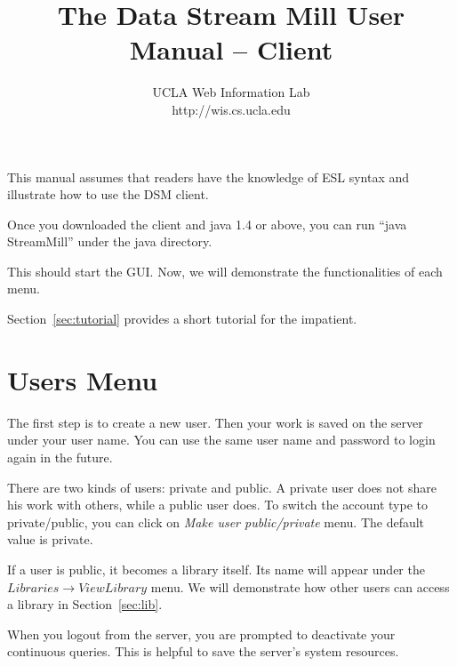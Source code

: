 \documentclass[10pt]{article}
\title{\Huge \bf The Data Stream Mill User Manual -- Client \\}
\author{\Large UCLA Web Information Lab\\http://wis.cs.ucla.edu}
\begin{document}
\maketitle

This manual assumes that readers have the knowledge of ESL syntax \cite{ESL} and illustrate how to use the DSM client.

Once you downloaded the client and java 1.4 or above, you can run ``java StreamMill'' under the java directory.

This should start the GUI. Now, we will demonstrate the functionalities of each menu.

Section~\ref{sec:tutorial} provides a short tutorial for the impatient.

\section{Users Menu}
\label{sec:user}
The first step is to create a new user.  Then your work is saved on the server under your user name.  You can use the same user name and password to login again in the future.

There are two kinds of users: private and public.  A private user does not share his work with others, while a public user does.  To switch the account type to private/public, you can click on {\em Make user public/private} menu.  The default value is private.

If a user is public, it becomes a library itself.  Its name will appear under the {\em $Libraries \rightarrow View Library$} menu.  We will demonstrate how other users can access a library in Section~\ref{sec:lib}.

When you logout from the server, you are prompted to deactivate your continuous queries.  This is helpful to save the server's system resources.
\end{document}
